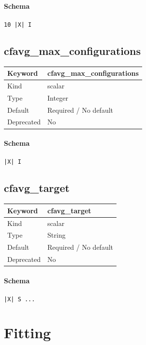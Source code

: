 \documentclass[11pt]{article}
\begin{document}
{{{{{\paragraph{Schema}
\begin{Verbatim}
10 |X| I
\end{Verbatim}

\subsection{cfavg\_max\_configurations}
\label{kw:cfavg-max-configurations}
\begin{longtable}{|p{1.5in}|p{4.5in}|}
\hline
Keyword & cfavg\_max\_configurations \\
\hline
Kind & scalar \\
\hline
Type & Integer \\
\hline
Default & Required / No default \\
\hline
Deprecated & No \\
\hline
\end{longtable}
\paragraph{Schema}
\begin{Verbatim}
|X| I
\end{Verbatim}

\subsection{cfavg\_target}
\label{kw:cfavg-target}
\begin{longtable}{|p{1.5in}|p{4.5in}|}
\hline
Keyword & cfavg\_target \\
\hline
Kind & scalar \\
\hline
Type & String \\
\hline
Default & Required / No default \\
\hline
Deprecated & No \\
\hline
\end{longtable}
\paragraph{Schema}
\begin{Verbatim}
|X| S ...
\end{Verbatim}

\section{Fitting}

}}}}}
\end{document}
